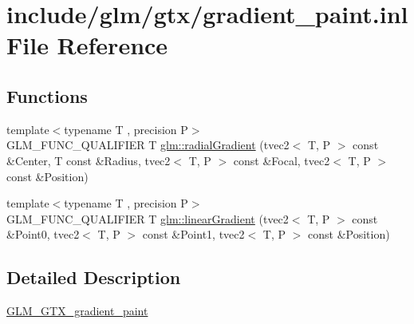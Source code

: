 \hypertarget{gradient__paint_8inl}{}\section{include/glm/gtx/gradient\+\_\+paint.inl File Reference}
\label{gradient__paint_8inl}
\subsection*{Functions}
\begin{DoxyCompactItemize}
\item 
{\footnotesize template$<$typename T , precision P$>$ }\\G\+L\+M\+\_\+\+F\+U\+N\+C\+\_\+\+Q\+U\+A\+L\+I\+F\+I\+ER T \hyperlink{group__gtx__gradient__paint_ga166d43d567a4cf150579a92f69b0dc9f}{glm\+::radial\+Gradient} (tvec2$<$ T, P $>$ const \&Center, T const \&Radius, tvec2$<$ T, P $>$ const \&Focal, tvec2$<$ T, P $>$ const \&Position)
\item 
{\footnotesize template$<$typename T , precision P$>$ }\\G\+L\+M\+\_\+\+F\+U\+N\+C\+\_\+\+Q\+U\+A\+L\+I\+F\+I\+ER T \hyperlink{group__gtx__gradient__paint_gacde26d5e0c4a1856467bded9dfad9040}{glm\+::linear\+Gradient} (tvec2$<$ T, P $>$ const \&Point0, tvec2$<$ T, P $>$ const \&Point1, tvec2$<$ T, P $>$ const \&Position)
\end{DoxyCompactItemize}


\subsection{Detailed Description}
\hyperlink{group__gtx__gradient__paint}{G\+L\+M\+\_\+\+G\+T\+X\+\_\+gradient\+\_\+paint} 